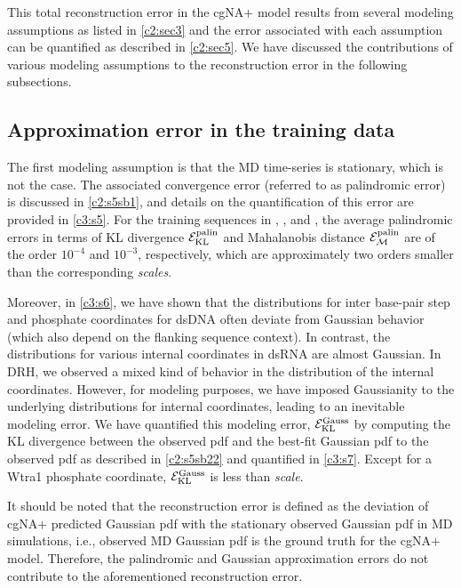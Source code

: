 This total reconstruction error in the cgNA$+$ model results from several modeling assumptions as listed in \cref{c2:sec3} and the error associated with each assumption can be quantified as described in \cref{c2:sec5}.
We have discussed the contributions of various modeling assumptions to the reconstruction error in the following subsections.

\subsection{Approximation error in the training data}
The first modeling assumption is that the MD time-series is stationary, which is not the case. The associated convergence error (referred to as palindromic error) is discussed in \cref{c2:s5sb1}, and details on the quantification of this error are provided in \cref{c3:s5}.
For the training sequences in \Lbdna, \Lbrna, and \Lbdrh, the average palindromic errors in terms of KL divergence ${\mathcal E}_{\text{KL}}^{\text{palin}}$ and Mahalanobis distance ${\mathcal E}_{\mathcal{M}}^{\text{palin}}$ are of the order $10^{-4}$ and $10^{-3}$, respectively, which are approximately two orders smaller than the corresponding \textit{scales}.

Moreover, in \cref{c3:s6}, we have shown that the distributions for inter base-pair step and phosphate coordinates for dsDNA often deviate from Gaussian behavior (which also depend on the flanking sequence context).
In contrast, the distributions for various internal coordinates in dsRNA are almost Gaussian.
In DRH, we observed a mixed kind of behavior in the distribution of the internal coordinates.
However, for modeling purposes, we have imposed Gaussianity to the underlying distributions for internal coordinates, leading to an inevitable modeling error. 
We have quantified this modeling error, ${\mathcal E}_{\text{KL}}^{\text{Gauss}}$ by computing the KL divergence between the observed pdf and the best-fit Gaussian pdf to the observed pdf as described in \cref{c2:s5sb22} and quantified in \cref{c3:s7}.
Except for a Wtra1 phosphate coordinate, ${\mathcal E}_{\text{KL}}^{\text{Gauss}}$ is less than \textit{scale}.

It should be noted that the reconstruction error is defined as the deviation of cgNA$+$ predicted Gaussian pdf with the stationary observed Gaussian pdf in MD simulations, i.e., observed MD Gaussian pdf is the ground truth for the cgNA$+$ model.
Therefore, the palindromic and Gaussian approximation errors do not contribute to the aforementioned reconstruction error.

